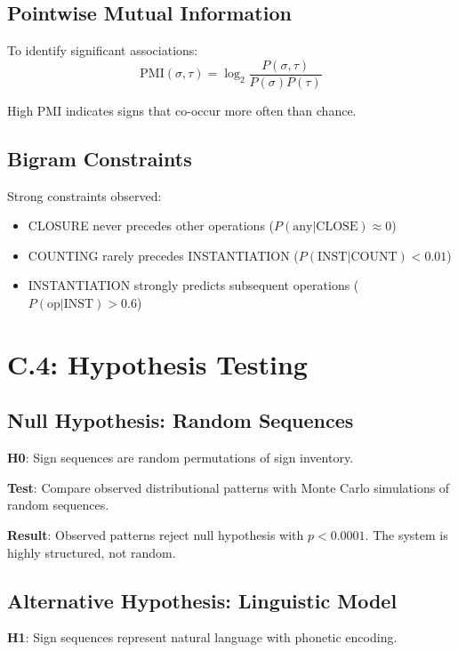 \subsection*{Pointwise Mutual Information}

To identify significant associations:
\[
\text{PMI}(\sigma, \tau) = \log_2 \frac{P(\sigma, \tau)}{P(\sigma)P(\tau)}
\]

High PMI indicates signs that co-occur more often than chance.

\subsection*{Bigram Constraints}

Strong constraints observed:
\begin{itemize}
    \item CLOSURE never precedes other operations ($P(\text{any}|\text{CLOSE}) \approx 0$)
    \item COUNTING rarely precedes INSTANTIATION ($P(\text{INST}|\text{COUNT}) < 0.01$)
    \item INSTANTIATION strongly predicts subsequent operations ($P(\text{op}|\text{INST}) > 0.6$)
\end{itemize}

\section*{C.4: Hypothesis Testing}

\subsection*{Null Hypothesis: Random Sequences}

\textbf{H0}: Sign sequences are random permutations of sign inventory.

\textbf{Test}: Compare observed distributional patterns with Monte Carlo simulations of random sequences.

\textbf{Result}: Observed patterns reject null hypothesis with $p < 0.0001$. The system is highly structured, not random.

\subsection*{Alternative Hypothesis: Linguistic Model}

\textbf{H1}: Sign sequences represent natural language with phonetic encoding.

